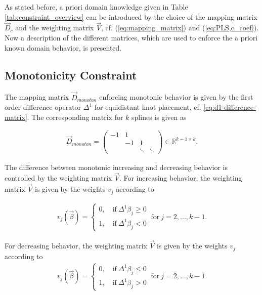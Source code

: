 As stated before, a priori domain knowledge given in Table \ref{tab:constraint_overview} can be introduced by the choice of the mapping matrix $\vec{D}_c$ and the weighting matrix $\vec{V}$, cf. (\ref{eq:mapping_matrix}) and (\ref{eq:PLS,c_coef}). Now a description of the different matrices, which are used to enforce the a priori known domain behavior, is presented. 

\subsection{Monotonicity Constraint}

The mapping matrix $\vec{D}_{monoton}$ enforcing monotonic behavior is given by the first order difference operator $\Delta^1$ for equidistant knot placement, cf. \ref{eq:d1-difference-matrix}. The corresponding matrix for $k$ splines is given as

\begin{align} \label{eq:D_c_monoton}
	\vec{D}_{monoton} = \begin{pmatrix}  -1 & 1  &  		& \\ 
		& -1 & 1 		& \\ 
		&    & \ddots  & \ddots  
	\end{pmatrix} \in \mathbb{R}^{k-1 \times k}.
\end{align}

The difference between monotonic increasing and decreasing behavior is controlled by the weighting matrix $\vec{V}$. For increasing behavior, the weighting matrix $\vec{V}$ is given by the weights $v_j$ according to

\begin{align} \label{eq:v_monoton_inc}
	v_j(\vec{\beta}) = \begin{cases}
			0, \quad \text{if} \ \Delta^1\beta_j \ge 0 \\ 
			1, \quad \text{if} \ \Delta^1\beta_j < 0
	\end{cases}	\ \text{for} \ j=2, \dots, k-1.
\end{align}

For decreasing behavior, the weighting matrix $\vec{V}$ is given by the weights $v_j$ according to
\begin{align} \label{eq:v_monoton_dec}
	v_j(\vec{\beta}) = \begin{cases} 0, \quad \text{if} \ \Delta^1\beta_j \le 0 \\ 
		1, \quad \text{if} \ \Delta^1\beta_j > 0
	\end{cases} \ \text{for} \ j=2, \dots, k-1.
\end{align}

